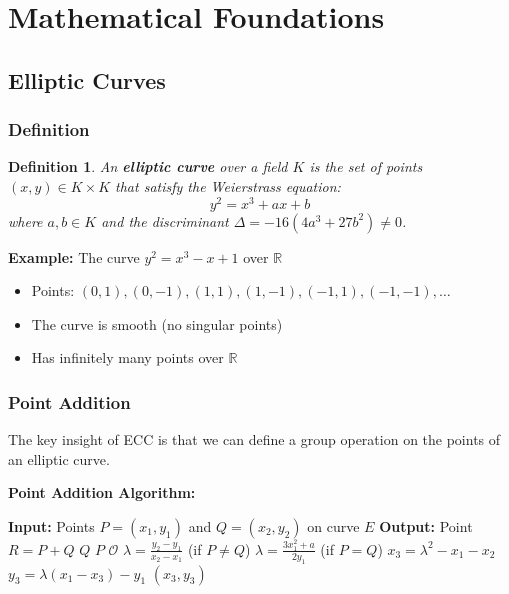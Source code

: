 \documentclass[11pt,a4paper]{article}
\newtheorem{definition}[theorem]{Definition}
\begin{document}
\section{Mathematical Foundations}

\subsection{Elliptic Curves}

\subsubsection{Definition}

\begin{definition}
An \textbf{elliptic curve} over a field $K$ is the set of points $(x,y) \in K \times K$ that satisfy the Weierstrass equation:
$$y^2 = x^3 + ax + b$$
where $a, b \in K$ and the discriminant $\Delta = -16(4a^3 + 27b^2) \neq 0$.
\end{definition}

\begin{examplebox}
\textbf{Example:} The curve $y^2 = x^3 - x + 1$ over $\mathbb{R}$
\begin{itemize}
    \item Points: $(0,1), (0,-1), (1,1), (1,-1), (-1,1), (-1,-1), \ldots$
    \item The curve is smooth (no singular points)
    \item Has infinitely many points over $\mathbb{R}$
\end{itemize}
\end{examplebox}

\subsubsection{Point Addition}

The key insight of ECC is that we can define a group operation on the points of an elliptic curve.

\begin{mathbox}
\textbf{Point Addition Algorithm:}
\begin{algorithmic}
\STATE \textbf{Input:} Points $P = (x_1, y_1)$ and $Q = (x_2, y_2)$ on curve $E$
\STATE \textbf{Output:} Point $R = P + Q$
    \RETURN $Q$
    \RETURN $P$
    \RETURN $\mathcal{O}$
\ELSE
    \STATE $\lambda = \frac{y_2 - y_1}{x_2 - x_1}$ (if $P \neq Q$)
    \STATE $\lambda = \frac{3x_1^2 + a}{2y_1}$ (if $P = Q$)
    \STATE $x_3 = \lambda^2 - x_1 - x_2$
    \STATE $y_3 = \lambda(x_1 - x_3) - y_1$
    \RETURN $(x_3, y_3)$
\ENDIF
\end{algorithmic}
\end{mathbox}
\end{document}
